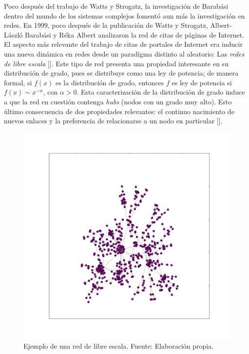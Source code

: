 \documentclass[../main.tex]{subfiles}
\begin{document}


Poco después del trabajo de Watts y Strogatz, la investigación de Barabási dentro del mundo de los sistemas complejos fomentó aun más la investigación en redes. En 1999, poco después de la publicación de Watts y Strogatz, Albert-László Barabási y Réka Albert analizaron la red de citas de páginas de Internet. El aspecto más relevante del trabajo de citas de portales de Internet era inducir una nueva dinámica en redes desde un paradigma distinto al aleatorio: Las \textit{redes de libre escala} [\cite{Barabasi1999}]. Este tipo de red presenta una propiedad interesante en su distribución de grado, pues se distribuye como una ley de potencia; de manera formal, si $f(x)$ es la distribución de grado, entonces $f$ es ley de potencia si $f(x) \sim x^{-\alpha} $, con $\alpha > 0$. Esta caracterización de la distribución de grado induce a que la red en cuestión contenga \textit{hubs} (nodos con un grado muy alto).  Esto último consecuencia de dos propiedades relevantes: el continuo nacimiento de nuevos enlaces y la preferencia de relacionarse a un nodo en particular [\cite{Barabsi2005}].  


\begin{figure}[h!]
    \centering
    \includegraphics[scale = 0.35]{images/marcoteorico_barabasi.pdf}
    \caption{Ejemplo de una red de libre escala. Fuente: Elaboración propia.}
    \label{fig:marcoteorico_scale_free}
\end{figure}
\end{document}
